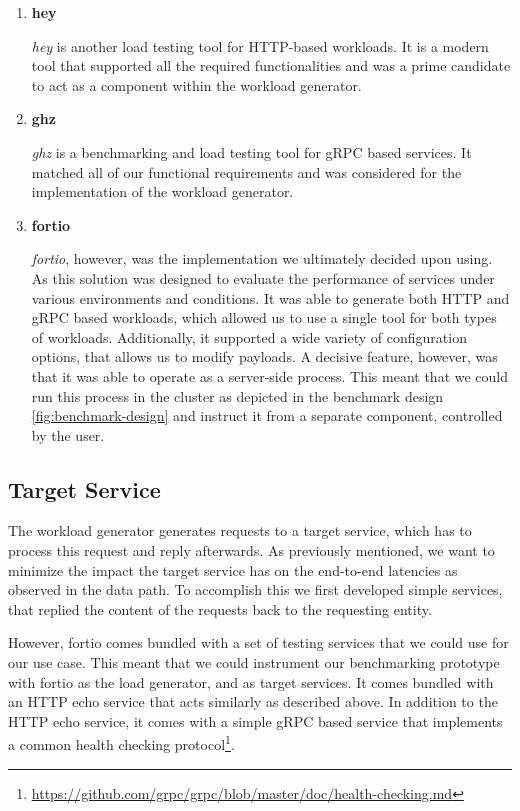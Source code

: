 \begin{enumerate}[label=\textbf{WG\arabic*}, leftmargin=3\parindent]
    \item \textbf{hey}
    \label{wg-3}    
    
    \textit{hey} is another load testing tool for HTTP-based workloads. It is a modern tool that supported all the required functionalities and was a prime candidate to act as a component within the workload generator.
    
    \item \textbf{ghz}
    \label{wg-4}
    
    \textit{ghz} is a benchmarking and load testing tool for gRPC based services. It matched all of our functional requirements and was considered for the implementation of the workload generator.
    
    \item \textbf{fortio}
    \label{wg-5}
    
    \textit{fortio}, however, was the implementation we ultimately decided upon using. As this solution was designed to evaluate the performance of services under various environments and conditions. It was able to generate both HTTP and gRPC based workloads, which allowed us to use a single tool for both types of workloads. Additionally, it supported a wide variety of configuration options, that allows us to modify payloads. A decisive feature, however, was that it was able to operate as a server-side process. This meant that we could run this process in the cluster as depicted in the benchmark design \cref{fig:benchmark-design} and instruct it from a separate component, controlled by the user.
\end{enumerate}



\subsection{Target Service}
\label{sec:system:target-service}

The workload generator generates requests to a target service, which has to process this request and reply afterwards. As previously mentioned, we want to minimize the impact the target service has on the end-to-end latencies as observed in the data path. To accomplish this we first developed simple services, that replied the content of the requests back to the requesting entity. 

However, fortio comes bundled with a set of testing services that we could use for our use case. This meant that we could instrument our benchmarking prototype with fortio as the load generator, and as target services. It comes bundled with an HTTP echo service that acts similarly as described above. In addition to the HTTP echo service, it comes with a simple gRPC based service that implements a common health checking protocol\footnote{\url{https://github.com/grpc/grpc/blob/master/doc/health-checking.md}}. 



